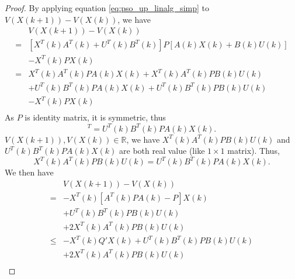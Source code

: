 \documentclass{sig-alternate}
\begin{document}
\begin{proof}
By applying equation \eqref{eq:pso_up_linalg_simp} to $ V( X(k+1) ) - V( X(k) ) $, we have
\begin{equation}
\label{eq:lyapunov_delta2}
\begin{aligned}
& V( X(k+1) ) - V( X(k) ) \\
= & [ X^{T}(k)  A^{T}(k) + U^{T}(k) B^{T}(k) ] P [ A(k) X(k) + B(k) U(k) ] \\ & - X^{T}(k) P X(k) \\
= & X^{T}(k)  A^{T}(k) P A(k) X(k) +  X^{T}(k)  A^{T}(k) P B(k) U(k) \\
& + U^{T}(k) B^{T}(k) P A(k) X(k) + U^{T}(k) B^{T}(k) P B(k) U(k) \\ & - X^{T}(k) P X(k) \\
\end{aligned}
\end{equation}
As $ P $ is identity matrix, it is symmetric, thus
\begin{equation}
[ X^{T}(k)  A^{T}(k) P B(k) U(k) ]^{T} =  U^{T}(k) B^{T}(k) P A(k) X(k).
\end{equation}
$ V( X(k+1) ) , V( X(k) ) \in \mathbb{R} $, 
we have $ X^{T}(k)  A^{T}(k) P B(k) U(k) $ and $  U^{T}(k) B^{T}(k) P A(k) X(k) $ are both real value (like $ 1 \times 1 $ matrix).
Thus, 
\begin{equation}
 X^{T}(k)  A^{T}(k) P B(k) U(k) =   U^{T}(k) B^{T}(k) P A(k) X(k) .
\end{equation}
We then have
\begin{equation}
\label{eq:lyapunov_delta3}
\begin{aligned}
& V( X(k+1) ) - V( X(k) ) \\
= & - X^{T}(k) [ A^{T}(k) P A(k) - P ] X(k) \\
& + U^{T}(k) B^{T}(k) P B(k) U(k)  \\
& + 2 X^{T}(k)  A^{T}(k) P B(k) U(k) \\
\leq & - X^{T}(k) Q' X(k)  + U^{T}(k) B^{T}(k) P B(k) U(k) \\
& + 2 X^{T}(k)  A^{T}(k) P B(k) U(k) \\
\end{aligned}
\end{equation}


\end{proof}
\end{document}
